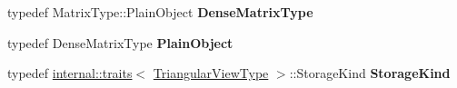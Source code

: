 \begin{DoxyCompactItemize}
typedef Matrix\+Type\+::\+Plain\+Object {\bfseries Dense\+Matrix\+Type}
\item 
\mbox{\label{class_eigen_1_1_triangular_view_impl_3_01___matrix_type_00_01___mode_00_01_dense_01_4_ab923c4af1eea706086280a5877f06c0a}} 
typedef Dense\+Matrix\+Type {\bfseries Plain\+Object}
\item 
\mbox{\label{class_eigen_1_1_triangular_view_impl_3_01___matrix_type_00_01___mode_00_01_dense_01_4_a41b41c49d7a90148789fd51dee96a9f7}} 
typedef \mbox{\hyperlink{struct_eigen_1_1internal_1_1traits}{internal\+::traits}}$<$ \mbox{\hyperlink{class_eigen_1_1_triangular_view}{Triangular\+View\+Type}} $>$\+::Storage\+Kind {\bfseries Storage\+Kind}
\end{DoxyCompactItemize}
